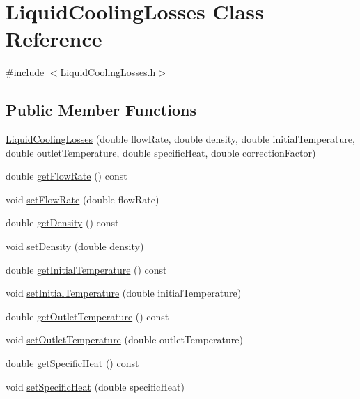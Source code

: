 \hypertarget{class_liquid_cooling_losses}{}\section{Liquid\+Cooling\+Losses Class Reference}
\label{class_liquid_cooling_losses}


{\ttfamily \#include $<$Liquid\+Cooling\+Losses.\+h$>$}

\subsection*{Public Member Functions}
\begin{DoxyCompactItemize}
\item 
\hyperlink{class_liquid_cooling_losses_a91eb84033b28a6bcfc817c08c317e63e}{Liquid\+Cooling\+Losses} (double flow\+Rate, double density, double initial\+Temperature, double outlet\+Temperature, double specific\+Heat, double correction\+Factor)
\item 
double \hyperlink{class_liquid_cooling_losses_acb4a68199bdc5f0597d1feadc3ecdb2c}{get\+Flow\+Rate} () const
\item 
void \hyperlink{class_liquid_cooling_losses_a7739742c5f21919a62c304b7c525b1b6}{set\+Flow\+Rate} (double flow\+Rate)
\item 
double \hyperlink{class_liquid_cooling_losses_ab2a34915eeba8bcea46d67a72cbe17d2}{get\+Density} () const
\item 
void \hyperlink{class_liquid_cooling_losses_a1fcb1780b588e0a6e5ca052ce2b360dc}{set\+Density} (double density)
\item 
double \hyperlink{class_liquid_cooling_losses_a4cfb23800b80e99858bbc5c3ef5169eb}{get\+Initial\+Temperature} () const
\item 
void \hyperlink{class_liquid_cooling_losses_aa7f7718de77a96b8e269a06a24d297d8}{set\+Initial\+Temperature} (double initial\+Temperature)
\item 
double \hyperlink{class_liquid_cooling_losses_ae6364da9b374e95dd657096350464acb}{get\+Outlet\+Temperature} () const
\item 
void \hyperlink{class_liquid_cooling_losses_ab8ea8e748853e18fa480afa0b3e417ee}{set\+Outlet\+Temperature} (double outlet\+Temperature)
\item 
double \hyperlink{class_liquid_cooling_losses_aa60623b6f1fab605d25c9c24e8dd00ec}{get\+Specific\+Heat} () const
\item 
void \hyperlink{class_liquid_cooling_losses_a38ff1ff4dc0de69c72db094bf2259993}{set\+Specific\+Heat} (double specific\+Heat)

\end{DoxyCompactItemize}
